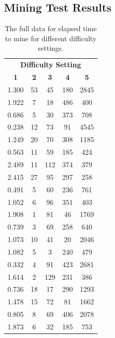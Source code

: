 \documentclass{l4proj}
\begin{document}
\begin{appendices}
\section{Mining Test Results}
\begin{table}[!ht]
    \centering
    \begin{tabular}{ccccc}
    \hline
    \multicolumn{5}{c}{\textbf{Difficulty Setting}}                \\
    \textbf{1} & \textbf{2} & \textbf{3} & \textbf{4} & \textbf{5} \\ \hline
    1.300      & 53         & 45         & 180        & 2845       \\
    1.922      & 7          & 18         & 486        & 400        \\
    0.686      & 5          & 30         & 373        & 708        \\
    0.238      & 12         & 73         & 91         & 4545       \\
    1.249      & 20         & 70         & 308        & 1185       \\
    0.563      & 11         & 59         & 185        & 424        \\
    2.489      & 11         & 112        & 374        & 379        \\
    2.415      & 27         & 95         & 297        & 258        \\
    0.491      & 5          & 60         & 236        & 761        \\
    1.052      & 6          & 96         & 351        & 403        \\
    1.908      & 1          & 81         & 46         & 1769       \\
    0.739      & 3          & 69         & 258        & 640        \\
    1.073      & 10         & 41         & 20         & 2046       \\
    1.082      & 5          & 3          & 240        & 479        \\
    0.332      & 4          & 91         & 423        & 2681       \\
    1.614      & 2          & 129        & 231        & 386        \\
    0.736      & 18         & 17         & 290        & 1293       \\
    1.478      & 15         & 72         & 81         & 1662       \\
    0.805      & 8          & 69         & 406        & 2078       \\
    1.873      & 6          & 32         & 185        & 753       
    \end{tabular}
    \vspace{1cm}
    \caption{
        The full data for elapsed time to mine for different difficulty settings.
    }
    \label{tab:mining}
\end{table}
\end{appendices}
\end{document}
